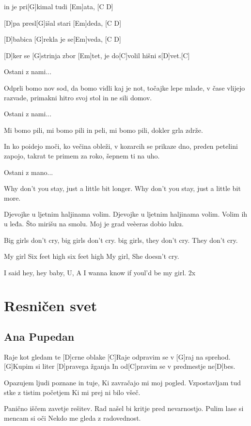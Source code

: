 \documentclass[a4paper,12pt]{article}
\begin{document}
\begin{multicols}{2}
\begin{guitar}
[D]in je pri[G]kimal tudi [Em]ata, [C D]

[D]pa presl[G]išal stari [Em]deda, [C D]

[D]babica [G]rekla je se[Em]veda, [C D]

[D]ker se [G]strinja zbor [Em]tet, je do[C]volil hišni s[D]vet.[C] 


Ostani z nami... 


Odprli bomo nov sod, 
da bomo vidli kaj je not, 
točajke lepe mlade, 
v čase vlijejo razvade, 
primakni hitro svoj stol  in ne sili domov. 


Ostani z nami... 


Mi bomo pili, mi bomo pili in peli, 
mi bomo pili, dokler grla zdrže. 
    
    
In ko poidejo moči, ko večina obleži, 
v kozarcih se prikaze dno, 
preden petelini zapojo, 
takrat te primem za roko, šepnem ti na uho.


Ostani z mano...


Why don't you stay,
just a little bit longer.
Why don't you stay,
just a little bit more.


Djevojke u ljetnim haljinama volim.
Djevojke u ljetnim haljinama volim.
Volim ih u leđa.
Što mirišu na smolu.
Moj je grad veèeras dobio luku.


Big girls don't cry,
big girls don't cry.
big girls, they don't cry.
They don't cry.


My girl
Six feet high
six feet high
My girl, She doesn't cry.


I said hey, hey baby, U, A
I wanna know if youl'd be my girl. 2x

\end{guitar}
\section{Resničen svet}
\subsection*{Ana Pupedan}
\begin{guitar}
[G]Raje kot gledam te [D]crne oblake
[C]Raje odpravim se v [G]raj na sprehod.
[G]Kupim si liter [D]pravega žganja
In od[C]pravim se v predmestje ne[D]bes.


Opazujem ljudi poznane in tuje,
Ki zavračajo mi moj pogled.
Vzpostavljam tud stke z tistim početjem
Ki mi prej ni bilo všeč.


Panično iščem zavetje rešitev.
Rad našel bi kritje pred nevarnostjo.
Pulim lase si mencam si oči
Nekdo me gleda z radovednost.



\end{guitar}
\end{multicols}
\end{document}
